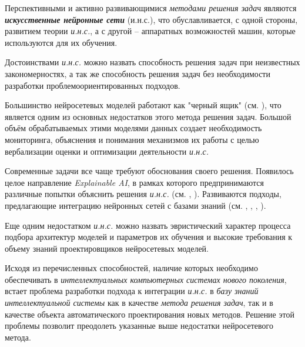 Перспективными и активно развивающимися \textit{методами решения зада}ч являются \textbf{\textit{искусственные нейронные сети}} (и.н.с.), что обуславливается, с одной стороны, развитием теории \textit{и.н.с.}, а с другой -- аппаратных возможностей машин, которые используются для их обучения.

Достоинствами \textit{и.н.с.} можно назвать способность решения задач при неизвестных закономерностях, а так же способность решения задач без необходимости разработки проблемоориентированных подходов.

Большинство нейросетевых моделей работают как "черный ящик"{} (см. ), что является одним из основных недостатков этого метода решения задач. Большой объём обрабатываемых этими моделями данных создает необходимость мониторинга, объяснения и понимания механизмов их работы с целью вербализации оценки и оптимизации деятельности \textit{и.н.с.}

Современные задачи все чаще требуют обоснования своего решения. Появилось целое направление \textit{Explainable AI}, в рамках которого предпринимаются различные попытки объяснить решения \textit{и.н.с.} (см. , ). Развиваются подходы, предлагающие интеграцию нейронных сетей с базами знаний (см. , , , ).

Еще одним недостатком \textit{и.н.с.} можно назвать эвристический характер процесса подбора архитектур моделей и параметров их обучения и высокие требования к объему знаний проектировщиков нейросетевых моделей.

Исходя из перечисленных способностей, наличие которых необходимо обеспечивать в \textit{интеллектуальных компьютерных системах нового поколения}, встает проблема разработки подхода к интеграции \textit{и.н.с.} в \textit{базу знаний} \textit{интеллектуальной системы} как в качестве \textit{метода решения задач}, так и в качестве объекта автоматического проектирования новых методов. Решение этой проблемы позволит преодолеть указанные выше недостатки нейросетевого метода.

